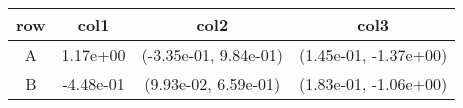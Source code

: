 \begin{tabular}{cccc}
\toprule
row&col1&col2&col3\tabularnewline
\midrule
A&1.17e+00& (-3.35e-01, 9.84e-01)& (1.45e-01, -1.37e+00)\tabularnewline
B&-4.48e-01& (9.93e-02, 6.59e-01)& (1.83e-01, -1.06e+00)\tabularnewline
\bottomrule
\end{tabular}
